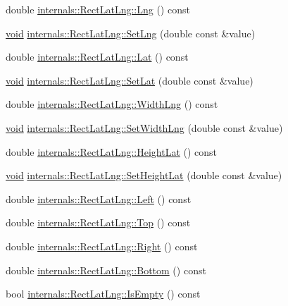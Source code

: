 \begin{DoxyCompactItemize}
\item 
double \hyperlink{group___o_p_map_widget_gae863985fa4b32d0a6f3d044068f2f35c}{internals\-::\-Rect\-Lat\-Lng\-::\-Lng} () const 
\item 
\hyperlink{group___u_a_v_objects_plugin_ga444cf2ff3f0ecbe028adce838d373f5c}{void} \hyperlink{group___o_p_map_widget_ga4c18157580e77af2ee41044803503708}{internals\-::\-Rect\-Lat\-Lng\-::\-Set\-Lng} (double const \&value)
\item 
double \hyperlink{group___o_p_map_widget_ga240d0cc702027ee4199ed6b4d9d7d91f}{internals\-::\-Rect\-Lat\-Lng\-::\-Lat} () const 
\item 
\hyperlink{group___u_a_v_objects_plugin_ga444cf2ff3f0ecbe028adce838d373f5c}{void} \hyperlink{group___o_p_map_widget_ga456a709265c60dd74dfce1cbc473cc6c}{internals\-::\-Rect\-Lat\-Lng\-::\-Set\-Lat} (double const \&value)
\item 
double \hyperlink{group___o_p_map_widget_ga4124280c2d4b4e103805d9cf5d3885bb}{internals\-::\-Rect\-Lat\-Lng\-::\-Width\-Lng} () const 
\item 
\hyperlink{group___u_a_v_objects_plugin_ga444cf2ff3f0ecbe028adce838d373f5c}{void} \hyperlink{group___o_p_map_widget_gad64021f64974740e6d28a4c8481c3f74}{internals\-::\-Rect\-Lat\-Lng\-::\-Set\-Width\-Lng} (double const \&value)
\item 
double \hyperlink{group___o_p_map_widget_gac283a070480139930c4a667981e4a0d4}{internals\-::\-Rect\-Lat\-Lng\-::\-Height\-Lat} () const 
\item 
\hyperlink{group___u_a_v_objects_plugin_ga444cf2ff3f0ecbe028adce838d373f5c}{void} \hyperlink{group___o_p_map_widget_ga4e9a91453da6d9159491981c81f181e8}{internals\-::\-Rect\-Lat\-Lng\-::\-Set\-Height\-Lat} (double const \&value)
\item 
double \hyperlink{group___o_p_map_widget_gaad643d7228be938282ad2c56a98cbc71}{internals\-::\-Rect\-Lat\-Lng\-::\-Left} () const 
\item 
double \hyperlink{group___o_p_map_widget_ga1c2062c6fe46c3769c4e9a0d5eef59b8}{internals\-::\-Rect\-Lat\-Lng\-::\-Top} () const 
\item 
double \hyperlink{group___o_p_map_widget_ga1a6604525748f3a62fb2e026bd5a4e9d}{internals\-::\-Rect\-Lat\-Lng\-::\-Right} () const 
\item 
double \hyperlink{group___o_p_map_widget_ga56065ec26f127c4763bcb6002a1f4e23}{internals\-::\-Rect\-Lat\-Lng\-::\-Bottom} () const 
\item 
bool \hyperlink{group___o_p_map_widget_ga4b7818f2eee94eb3c8ecb308da6a4c1b}{internals\-::\-Rect\-Lat\-Lng\-::\-Is\-Empty} () const 

\end{DoxyCompactItemize}
